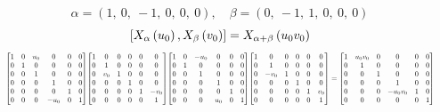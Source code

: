 \documentclass[11pt]{article}
\theoremstyle{definition}
\begin{document}
\[
\alpha = \left( 1, \  0, \  -1, \  0, \  0, \  0\right), \quad \beta = \left( 0, \  -1, \  1, \  0, \  0, \  0\right)
\]
\[
\scaletoalign{\textwidth}{\left[ X_{\alpha}\left(u_{0}\right), X_{\beta}\left(v_{0}\right) \right] = X_{\alpha + \beta}\left(u_{0} v_{0}\right)}
\]
\[
\scaletoalign{\textwidth}{{\left[\begin{matrix}1 & 0 & u_{0} & 0 & 0 & 0\\0 & 1 & 0 & 0 & 0 & 0\\0 & 0 & 1 & 0 & 0 & 0\\0 & 0 & 0 & 1 & 0 & 0\\0 & 0 & 0 & 0 & 1 & 0\\0 & 0 & 0 & - u_{0} & 0 & 1\end{matrix}\right]} {\left[\begin{matrix}1 & 0 & 0 & 0 & 0 & 0\\0 & 1 & 0 & 0 & 0 & 0\\0 & v_{0} & 1 & 0 & 0 & 0\\0 & 0 & 0 & 1 & 0 & 0\\0 & 0 & 0 & 0 & 1 & - v_{0}\\0 & 0 & 0 & 0 & 0 & 1\end{matrix}\right]} {\left[\begin{matrix}1 & 0 & - u_{0} & 0 & 0 & 0\\0 & 1 & 0 & 0 & 0 & 0\\0 & 0 & 1 & 0 & 0 & 0\\0 & 0 & 0 & 1 & 0 & 0\\0 & 0 & 0 & 0 & 1 & 0\\0 & 0 & 0 & u_{0} & 0 & 1\end{matrix}\right]} {\left[\begin{matrix}1 & 0 & 0 & 0 & 0 & 0\\0 & 1 & 0 & 0 & 0 & 0\\0 & - v_{0} & 1 & 0 & 0 & 0\\0 & 0 & 0 & 1 & 0 & 0\\0 & 0 & 0 & 0 & 1 & v_{0}\\0 & 0 & 0 & 0 & 0 & 1\end{matrix}\right]} = {\left[\begin{matrix}1 & u_{0} v_{0} & 0 & 0 & 0 & 0\\0 & 1 & 0 & 0 & 0 & 0\\0 & 0 & 1 & 0 & 0 & 0\\0 & 0 & 0 & 1 & 0 & 0\\0 & 0 & 0 & - u_{0} v_{0} & 1 & 0\\0 & 0 & 0 & 0 & 0 & 1\end{matrix}\right]}}
\]
\end{document}
